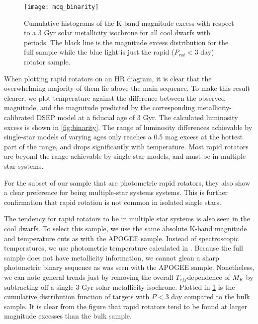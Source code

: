 \documentclass[manuscript]{aastex6}
\newcommand{\Teff}{\ensuremath{T_{eff}}}
\begin{document}
\begin{figure}[htb]
  \centering
  \texttt{[image: mcq\_binarity]}
  \caption{Cumulative histograms of the K-band magnitude excess with respect to
      a 3 Gyr solar metallicity isochrone for all cool dwarfs with 
      \citet{McQuillan14} periods. The black line is the magnitude excess
      distribution for the full sample while the blue light is just the rapid
  (\(P_{rot} < 3\) day) rotator sample.\label{fig:mcqbinarity}}
\end{figure}


When plotting rapid rotators on an HR diagram, it is clear that the
overwhelming majority of them lie above the main sequence. To make this
result clearer, we plot temperature against the difference between the
observed magnitude, and the magnitude predicted by the corresponding
metallicity-calibrated DSEP model at a fiducial age of 3 Gyr. The
calculated luminosity excess is shown in \cref{fig:binarity}. The range
of luminosity differences achievable by single-star models of varying
ages only reaches a 0.5 mag excess at the hottest part of the range, and
drops significantly with temperature. Most rapid rotators are beyond the
range achievable by single-star models, and must be in multiple-star
systems.

For the subset of our sample that are photometric rapid rotators, they
also show a clear preference for being multiple-star systems systems.
This is further confirmation that rapid rotation is not common in
isolated single stars.

The tendency for rapid rotators to be in multiple star systems is also
seen in the \citet{McQuillan14} cool dwarfs. To select this sample, we
use the same absolute K-band magnitude and temperature cuts as with the
APOGEE sample. Instead of spectroscopic temperatures, we use photometric 
temperature calculated in \citet{Mathur17}. Because the full \citet{McQuillan14} 
sample does not have metallicity information, we cannot glean a sharp
photometric binary sequence as was seen with the APOGEE sample. Nonetheless,
we can note general trends just by removing the overall \Teff dependence of
\(M_K\) by subtracting off  a single 3 Gyr solar-metallicity
isochrone. Plotted in \cref{fig:mcqbinarity} is the cumulative distribution
function of \citet{McQuillan14} targets with \(P < 3\) day compared to the bulk
sample. It is clear from the figure that rapid rotators tend to be found at
larger magnitude excesses than the bulk sample.
\end{document}
